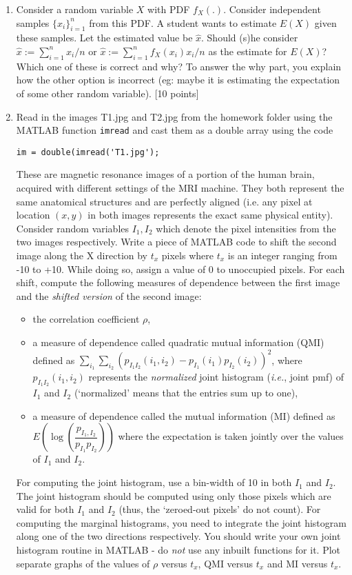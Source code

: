 \documentclass[11pt]{article}
\begin{document}
\begin{enumerate}
\item Consider a random variable $X$ with PDF $f_X(.)$. Consider independent samples $\{x_i\}_{i=1}^n$ from this PDF. A student wants to estimate $E(X)$ given these samples. Let the estimated value be $\hat{x}$. Should (s)he consider $\hat{x} := \sum_{i=1}^n x_i/n$ or $\hat{x} := \sum_{i=1}^n f_X(x_i) x_i/n$ as the estimate for $E(X)$? Which one of these is correct and why? To answer the why part, you explain how the other option is incorrect (eg: maybe it is estimating the expectation of some other random variable). \textsf{[10 points]}

\item Read in the images T1.jpg and T2.jpg from the homework folder using the MATLAB function \texttt{imread} and cast them as a double array using the code \begin{verbatim}im = double(imread('T1.jpg');\end{verbatim} These are magnetic resonance images of a portion of the human brain, acquired with different settings of the MRI machine. They both represent the same anatomical structures and are perfectly aligned (i.e. any pixel at location $(x,y)$ in both images represents the exact same physical entity). Consider random variables $I_1, I_2$ which denote the pixel intensities from the two images respectively. Write a piece of MATLAB code to shift the second image along the X direction by $t_x$ pixels where $t_x$ is an integer ranging from -10 to +10. While doing so, assign a value of 0 to unoccupied pixels. For each shift, compute the following measures of dependence between the first image and the \emph{shifted version} of the second image:
\begin{itemize}
\item the correlation coefficient $\rho$, 
\item a measure of dependence called quadratic mutual information (QMI) defined as $\sum_{i_1}\sum_{i_2} (p_{I_1 I_2}(i_1,i_2)-p_{I_1}(i_1)p_{I_2}(i_2))^2$, where $p_{I_1 I_2}(i_1,i_2)$ represents the \emph{normalized} joint histogram (\textit{i.e.}, joint pmf) of $I_1$ and $I_2$ (`normalized' means that the entries sum up to one),
\item a measure of dependence called the mutual information (MI) defined as $E\left(\log \left( \dfrac{p_{I_1, I_2}}{p_{I_1} p_{I_2}}\right) \right)$ where the expectation is taken jointly over the values of $I_1$ and $I_2$.
\end{itemize}
For computing the joint histogram, use a bin-width of 10 in both $I_1$ and $I_2$. The joint histogram should be computed using only those pixels which are valid for both $I_1$ and $I_2$ (thus, the `zeroed-out pixels' do not count). For computing the marginal histograms, you need to integrate the joint histogram along one of the two directions respectively. You should write your own joint histogram routine in MATLAB - do \emph{not} use any inbuilt functions for it. Plot separate graphs of the values of $\rho$ versus $t_x$, QMI versus $t_x$ and MI versus $t_x$.\\

\end{enumerate}
\end{document}
